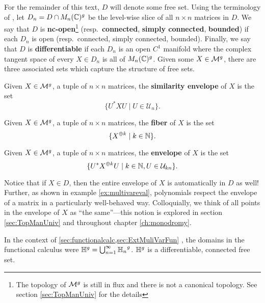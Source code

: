 For the remainder of this text, \(D\) will denote some free set. Using the
terminology of \cite{pascoeFreeNoncommutativePrincipal2020}, let
\(D_n = D \cap M_n(\mathbb{C})^g\) be the level-wise slice of all \(n \times n\)
matrices in \(D\). We say that \(D\) is \textbf{nc-open}\footnote{The topology of \(\mathcal{M}^g\)
  is still in flux and there is not a canonical topology. See section \ref{sec:TopManUniv} for
  the details } (resp.\ \textbf{connected}, \textbf{simply connected}, \textbf{bounded}) if each \(D_n\) is open
(resp.\ connected, simply connected, bounded). Finally, we say that \(D\) is
\textbf{differentiable} if each \(D_n\) is an open \(C^1\) manifold where the
complex tangent space of every \(X \in D_n\) is all of \(M_n(\mathbb{C})^g\).
Given some \(X \in \mathcal{M}^{g} \), there are three associated sets which capture the
structure of free sets.

\begin{definition}%
\label{def:semenv}
  Given \(X \in \mathcal{M}^{g} \), a tuple of \(n \times n\) matrices, the
  \textbf{similarity envelope} of \(X\) is the set
  \[
    \{U^* X U \mid  U \in \mathcal{U}_n\}.
  \]
\end{definition}

\begin{definition}[Fiber]%
\label{def:fiber}
  Given \(X \in \mathcal{M}^{g} \), a tuple of \(n \times n\) matrices, the
  \textbf{fiber} of \(X\) is the set
  \[
    \{X^{\oplus k} \mid  k \in \mathbb{N} \}.
  \]
\end{definition}

\begin{definition}[Envelope]%
\label{def:env}
  Given \(X \in \mathcal{M}^{g} \), a tuple of \(n \times n\) matrices, the
  \textbf{envelope} of \(X\) is the set
  \[
    \{ U^* X^{\oplus k} U \mid k \in \mathbb{N}, U \in \mathcal{U}_{kn} \}.
  \]
\end{definition}
Notice that if \(X \in D\), then the entire envelope of \(X\) is automatically
in \(D\) as well! Further, as shown in example \ref{ex:multivareval},
polynomials respect the envelope of a matrix in a particularly well-behaved way.
Colloquially, we think of all points in the envelope of \(X\) as ``the
same''---this notion is explored in section \ref{sec:TopManUniv} and throughout
chapter \ref{ch:monodromy}.

In the context of \cref{sec:functionalcalc,sec:ExtMuliVarFun}
%
, the domains in the functional calculus were
\(\mathbb{H}^g = \bigcup_{n=1}^{\infty} {\mathbb{H}_n}^g\). \(\mathbb{H} ^g\) is a differentiable, connected
free set.

